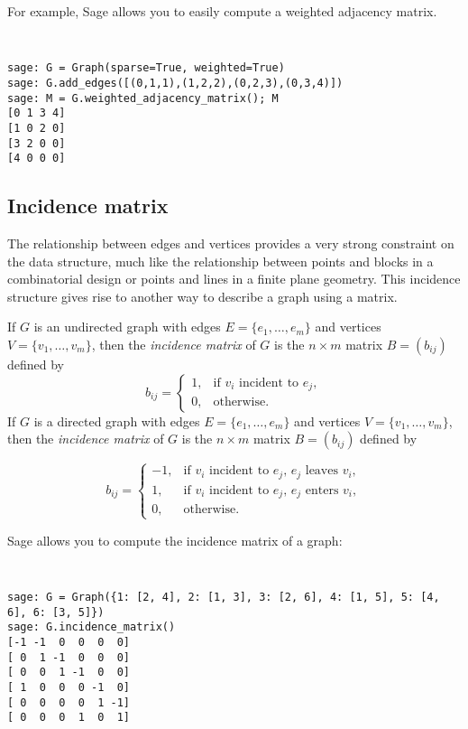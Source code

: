 For example, Sage allows you to easily compute a
weighted adjacency matrix.

%
\begin{center}
\fontsize{10pt}{10pt}
\selectfont
\tt
\begin{lstlisting}
sage: G = Graph(sparse=True, weighted=True)
sage: G.add_edges([(0,1,1),(1,2,2),(0,2,3),(0,3,4)])
sage: M = G.weighted_adjacency_matrix(); M
[0 1 3 4]
[1 0 2 0]
[3 2 0 0]
[4 0 0 0]
\end{lstlisting}
\end{center}
%

\subsection{Incidence matrix}

The relationship between edges and vertices provides a 
very strong constraint on the data structure, much like the
relationship between points and blocks in a combinatorial design
or points and lines in a finite plane geometry.
This incidence structure gives rise to another way
to describe a graph using a matrix.

If $G$ is an
undirected graph with edges $E = \{ e_1, \dots, e_m \}$ and vertices
$V = \{ v_1, \dots, v_m \}$, then the \emph{incidence matrix} of $G$
is the $n \times m$ matrix $B = (b_{ij})$ defined by
\[
b_{ij}
=
\begin{cases}
1, & \text{if $v_i$ incident to $e_j$}, \\
0, & \text{otherwise}.
\end{cases}
\]
If $G$ is a directed graph with edges $E = \{ e_1, \dots, e_m \}$
and vertices $V = \{ v_1, \dots, v_m \}$, then the
\emph{incidence matrix} of $G$ is the $n \times m$ matrix $B = (b_{ij})$
defined by

\[
b_{ij}
=
\begin{cases}
-1, & \text{if $v_i$ incident to $e_j$, $e_j$ leaves $v_i$}, \\
1,  & \text{if $v_i$ incident to $e_j$, $e_j$ enters $v_i$}, \\
0,  & \text{otherwise}.
\end{cases}
\]

Sage allows you to compute the incidence matrix of a
graph:
%
\begin{center}
\fontsize{9pt}{9pt}
\selectfont
\tt
\begin{lstlisting}
sage: G = Graph({1: [2, 4], 2: [1, 3], 3: [2, 6], 4: [1, 5], 5: [4, 6], 6: [3, 5]})
sage: G.incidence_matrix()
[-1 -1  0  0  0  0]
[ 0  1 -1  0  0  0]
[ 0  0  1 -1  0  0]
[ 1  0  0  0 -1  0]
[ 0  0  0  0  1 -1]
[ 0  0  0  1  0  1]
\end{lstlisting}
\end{center}
%

